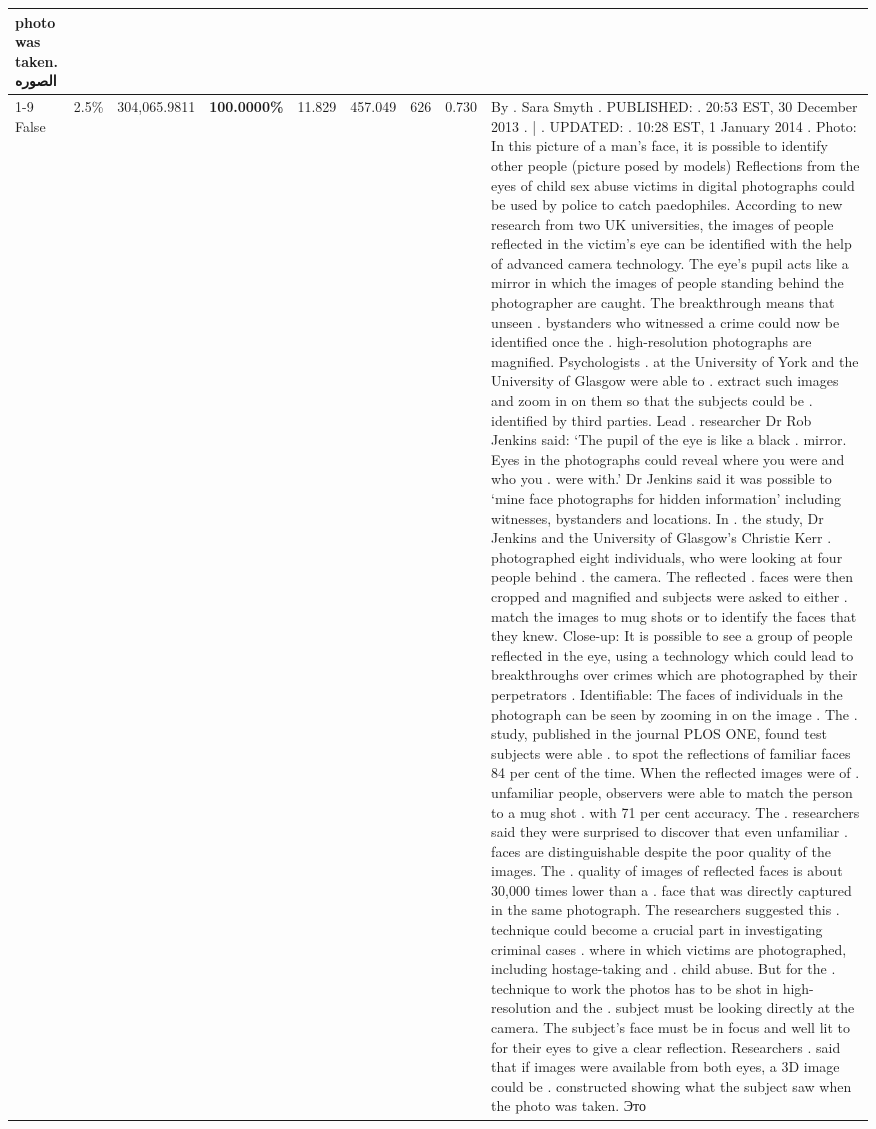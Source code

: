 \begin{table}[H]
\begin{tabular}{lllrlllll}
photo was taken. الصوره \\
\cline{1-9}
False & 2.5\% & \color{red} 304,065.9811 & \bfseries \color{red} 100.0000\% & 11.829 & 457.049 & 626 & 0.730 & By . Sara Smyth . PUBLISHED: . 20:53 EST, 30 December 2013 . | . UPDATED: . 10:28 EST, 1 January 2014 . Photo: In this picture of a man's face, it is possible to identify other people (picture posed by models) Reflections from the eyes of child sex abuse victims in digital photographs could be used by police to catch paedophiles. According to new research from two UK universities, the images of people reflected in the victim's eye can be identified with the help of advanced camera technology. The eye's pupil acts like a mirror in which the images of people standing behind the photographer are caught. The breakthrough means that unseen . bystanders who witnessed a crime could now be identified once the . high-resolution photographs are magnified. Psychologists . at the University of York and the University of Glasgow were able to . extract such images and zoom in on them so that the subjects could be . identified by third parties. Lead . researcher Dr Rob Jenkins said: ‘The pupil of the eye is like a black . mirror. Eyes in the photographs could reveal where you were and who you . were with.' Dr Jenkins said it was possible to ‘mine face photographs for hidden information' including witnesses, bystanders and locations. In . the study, Dr Jenkins and the University of Glasgow's Christie Kerr . photographed eight individuals, who were looking at four people behind . the camera. The reflected . faces were then cropped and magnified and subjects were asked to either . match the images to mug shots or to identify the faces that they knew. Close-up: It is possible to see a group of people reflected in the eye, using a technology which could lead to breakthroughs over crimes which are photographed by their perpetrators . Identifiable: The faces of individuals in the photograph can be seen by zooming in on the image . The . study, published in the journal PLOS ONE, found test subjects were able . to spot the reflections of familiar faces 84 per cent of the time. When the reflected images were of . unfamiliar people, observers were able to match the person to a mug shot . with 71 per cent accuracy. The . researchers said they were surprised to discover that even unfamiliar . faces are distinguishable despite the poor quality of the images. The . quality of images of reflected faces is about 30,000 times lower than a . face that was directly captured in the same photograph. The researchers suggested this . technique could become a crucial part in investigating criminal cases . where in which victims are photographed, including hostage-taking and . child abuse. But for the . technique to work the photos has to be shot in high-resolution and the . subject must be looking directly at the camera. The subject's face must be in focus and well lit to for their eyes to give a clear reflection. Researchers . said that if images were available from both eyes, a 3D image could be . constructed showing what the subject saw when the photo was taken. Это \\

\end{tabular}
\end{table}
